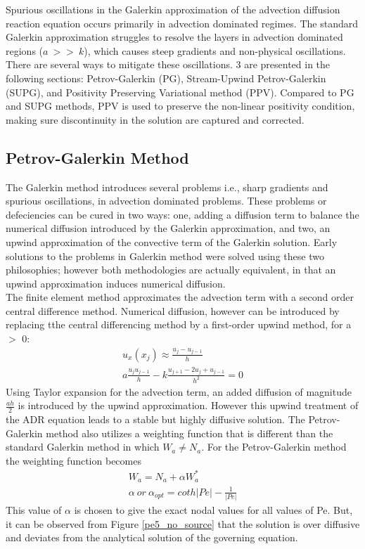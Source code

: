 \documentclass[12pt, oneside]{article}
\begin{document}
Spurious oscillations in the Galerkin approximation of the advection diffusion reaction equation occurs primarily in advection dominated regimes. The standard Galerkin approximation struggles to resolve the layers in advection dominated regions ($a\ >>\ k $), which causes steep gradients and non-physical oscillations. There are several ways to mitigate these oscillations. 3 are presented in the following sections: Petrov-Galerkin (PG), Stream-Upwind Petrov-Galerkin (SUPG), and Positivity Preserving Variational method (PPV). Compared to PG and SUPG methods, PPV is used to preserve the non-linear positivity condition, making sure discontinuity in the solution are captured and corrected.
\subsection{Petrov-Galerkin Method}
The Galerkin method introduces several problems i.e., sharp gradients and spurious oscillations, in advection dominated problems. These problems or defeciencies can be cured in two ways: one, adding a diffusion term to balance the numerical diffusion introduced by the Galerkin approximation, and two, an upwind approximation of the convective term of the Galerkin solution. Early solutions to the problems in Galerkin method were solved using these two philosophies; however both methodologies are actually equivalent, in that an upwind approximation induces numerical diffusion.\\
The finite element method approximates the advection term with a second order central difference method. Numerical diffusion, however can be introduced by replacing tthe central differencing method by a first-order upwind method, for a $>$ 0:
\begin{equation}
       \begin{aligned}
	    u_x(x_j) \approx \frac{u_j - u_{j - 1}}{h}\\
	    a \frac{u_j u_{j - 1}}{h} - k \frac{u_{j + 1} - 2u_j + u_{j-1}}{h^2} = 0
       \end{aligned}
\end{equation}
Using Taylor expansion for the advection term, an added diffusion of magnitude $\frac{ah}{2}$ is introduced by the upwind approximation. However this upwind treatment of the ADR equation leads to a stable but highly diffusive solution. The Petrov-Galerkin method also utilizes a weighting function that is different than the standard Galerkin method in which $W_a \neq N_a$. For the Petrov-Galerkin method the weighting function becomes
\begin{equation}
       \begin{gathered}
	    W_a = N_a + \alpha W_a^*\\
	    \alpha\ or\ \alpha_{opt} = coth|Pe| - \frac{1}{|Pe|}
       \end{gathered}
\end{equation}
This value of $\alpha$ is chosen to give the exact nodal values for all values of Pe. But, it can be observed from Figure \ref{pe5_no_source} that the solution is over diffusive and deviates from the analytical solution of the governing equation.
\end{document}
